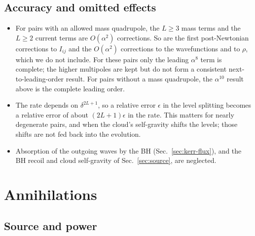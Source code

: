 \documentclass[11pt]{article}
\begin{document}
\subsection{Accuracy and omitted effects}
\begin{itemize}
\item For pairs with an allowed mass quadrupole, the $L\ge3$ mass terms and the $L\ge2$ current terms are $O(\alpha^2)$ corrections. So are the first post-Newtonian corrections to $I_{ij}$ and the $O(\alpha^2)$ corrections to the wavefunctions and to $\rho$, which we do not include. For these pairs only the leading $\alpha^8$ term is complete; the higher multipoles are kept but do not form a consistent next-to-leading-order result. For pairs without a mass quadrupole, the $\alpha^{10}$ result above is the complete leading order.
\item The rate depends on $\delta^{2L+1}$, so a relative error $\epsilon$ in the level splitting becomes a relative error of about $(2L+1)\epsilon$ in the rate. This matters for nearly degenerate pairs, and when the cloud's self-gravity shifts the levels; those shifts are not fed back into the evolution.
\item Absorption of the outgoing waves by the BH (Sec.~\ref{sec:kerr-flux}), and the BH recoil and cloud self-gravity of Sec.~\ref{sec:source}, are neglected.
\end{itemize}

\section{Annihilations}
\label{sec:ann}

\subsection{Source and power}
\end{document}
